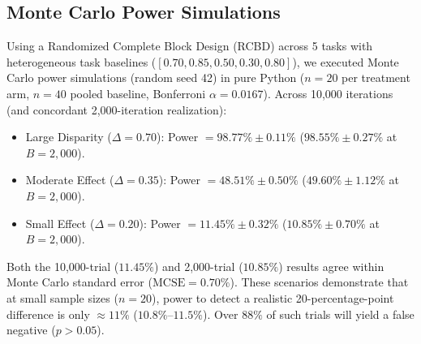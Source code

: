 \documentclass[11pt,a4paper]{article}
\begin{document}
\subsection{Monte Carlo Power Simulations}
Using a Randomized Complete Block Design (RCBD) across 5 tasks with heterogeneous task baselines ($[0.70, 0.85, 0.50, 0.30, 0.80]$), we executed Monte Carlo power simulations (random seed 42) in pure Python ($n=20$ per treatment arm, $n=40$ pooled baseline, Bonferroni $\alpha = 0.0167$). Across 10,000 iterations (and concordant 2,000-iteration realization):
\begin{itemize}
    \item Large Disparity ($\Delta = 0.70$): Power $= 98.77\% \pm 0.11\%$ ($98.55\% \pm 0.27\%$ at $B=2,000$).
    \item Moderate Effect ($\Delta = 0.35$): Power $= 48.51\% \pm 0.50\%$ ($49.60\% \pm 1.12\%$ at $B=2,000$).
    \item Small Effect ($\Delta = 0.20$): Power $= \mathbf{11.45\% \pm 0.32\%}$ ($\mathbf{10.85\% \pm 0.70\%}$ at $B=2,000$).
\end{itemize}
Both the 10,000-trial ($11.45\%$) and 2,000-trial ($10.85\%$) results agree within Monte Carlo standard error ($\text{MCSE} = 0.70\%$). These scenarios demonstrate that at small sample sizes ($n=20$), power to detect a realistic 20-percentage-point difference is only $\approx 11\%$ ($10.8\%$--$11.5\%$). Over $88\%$ of such trials will yield a false negative ($p > 0.05$).
\end{document}
